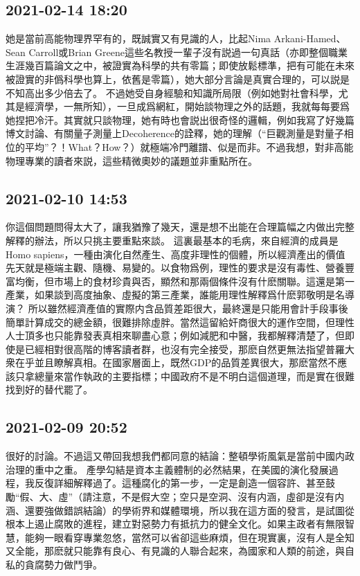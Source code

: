 \documentclass[twocolumn]{ctexart}
\begin{document}
\subsection*{2021-02-14 18:20}

她是當前高能物理界罕有的，既誠實又有見識的人，比起Nima Arkani-Hamed、Sean Carroll或Brian Greene這些名教授一輩子沒有説過一句真話（亦即整個職業生涯幾百篇論文之中，被證實為科學的共有零篇；即使放鬆標準，把有可能在未來被證實的非僞科學也算上，依舊是零篇），她大部分言論是真實合理的，可以説是不知高出多少倍去了。
不過她受自身經驗和知識所局限（例如她對社會科學，尤其是經濟學，一無所知），一旦成爲網紅，開始談物理之外的話題，我就每每要爲她捏把冷汗。其實就只談物理，她有時也會説出很奇怪的邏輯，例如我寫了好幾篇博文討論、有關量子測量上Decoherence的詮釋，她的理解（“巨觀測量是對量子相位的平均”？！What？How？）就極端冷門離譜、似是而非。不過我想，對非高能物理專業的讀者來説，這些精微奧妙的議題並非重點所在。
\subsection*{2021-02-10 14:53}

你這個問題問得太大了，讓我猶豫了幾天，還是想不出能在合理篇幅之内做出完整解釋的辦法，所以只挑主要重點來談。
這裏最基本的毛病，來自經濟的成員是Homo sapiens，一種由演化自然產生、高度非理性的個體，所以經濟產出的價值先天就是極端主觀、隨機、易變的。以食物爲例，理性的要求是沒有毒性、營養豐富均衡，但市場上的食材珍貴與否，顯然和那兩個條件沒有什麽關聯。這還是第一產業，如果談到高度抽象、虛擬的第三產業，誰能用理性解釋爲什麽郭敬明是名導演？
所以雖然經濟產值的實際内含品質差距很大，最終還是只能用會計手段事後簡單計算成交的總金額，很難排除虛胖。當然這留給奸商很大的運作空間，但理性人士頂多也只能靠發表真相來聊盡心意；例如減肥和中醫，我都解釋清楚了，但即使是已經相對很高階的博客讀者群，也沒有完全接受，那麽自然更無法指望普羅大衆在乎並且瞭解真相。在國家層面上，既然GDP的品質差異很大，那麽當然不應該只拿總量來當作執政的主要指標；中國政府不是不明白這個道理，而是實在很難找到好的替代罷了。
\subsection*{2021-02-09 20:52}

很好的討論。不過這又帶回我想我們都同意的結論：整頓學術風氣是當前中國内政治理的重中之重。
產學勾結是資本主義體制的必然結果，在美國的演化發展過程，我反復詳細解釋過了。這種腐化的第一步，一定是創造一個容許、甚至鼓勵“假、大、虛”（請注意，不是假大空；空只是空洞、沒有内涵，虛卻是沒有内涵、還要強做錯誤結論）的學術界和媒體環境，所以我在這方面的發言，是試圖從根本上遏止腐敗的進程，建立對惡勢力有抵抗力的健全文化。如果主政者有無限智慧，能夠一眼看穿專業忽悠，當然可以省卻這些麻煩，但在現實裏，沒有人是全知又全能，那麽就只能靠有良心、有見識的人聯合起來，為國家和人類的前途，與自私的貪腐勢力做鬥爭。
\end{document}
